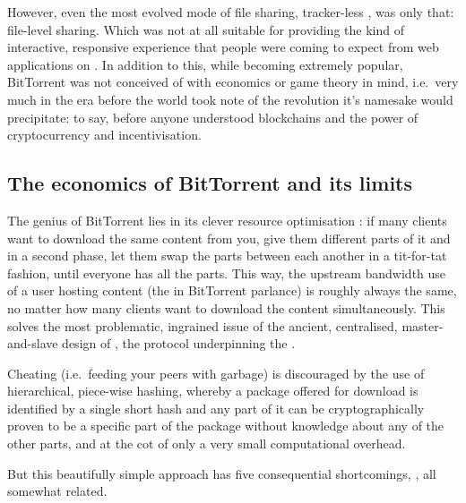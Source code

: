 However, even the most evolved mode of  file sharing, tracker-less  \cite{pouwelse2005bittorrent}, was only that: file-level sharing. Which was not at all suitable for providing the kind of interactive, responsive experience that people were coming to expect from web applications on . In addition to this, while becoming extremely popular, BitTorrent was not conceived of with economics or game theory in mind, i.e.\ very much in the era before the world took note of the revolution it's namesake would precipitate: to say, before anyone understood blockchains and the power of cryptocurrency and incentivisation.

\subsection{The economics of BitTorrent and its limits \statusgreen}

The genius of BitTorrent lies in its clever resource optimisation \cite{cohen2003incentives}: if many clients want to download the same content from you, give them different parts of it and in a second phase, let them swap the parts between each another in a tit-for-tat fashion, until everyone has all the parts. This way, the upstream bandwidth use of a user hosting  content (the  in BitTorrent parlance) is roughly always the same, no matter how many clients want to download the content simultaneously. This solves the most problematic, ingrained issue of the ancient, centralised, master-and-slave design of , the protocol underpinning the .

Cheating (i.e.\ feeding your peers with garbage) is discouraged by the use of hierarchical, piece-wise hashing, whereby a package offered for download is identified by a single short hash and any part of it can be cryptographically proven to be a specific part of the package without knowledge about any of the other parts, and at the cot of only a very small computational overhead. 

But this beautifully simple approach has five consequential shortcomings, \cite{locher2006free,piatek2007incentives}, all somewhat related.

